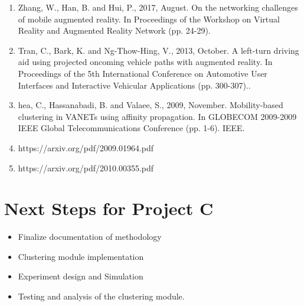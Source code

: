 \documentclass{article}
\begin{document}
\begin{enumerate}
    \item Zhang, W., Han, B. and Hui, P., 2017, August. On the networking challenges of mobile augmented reality. In Proceedings of the Workshop on Virtual Reality and Augmented Reality Network (pp. 24-29).
    \item Tran, C., Bark, K. and Ng-Thow-Hing, V., 2013, October. A left-turn driving aid using projected oncoming vehicle paths with augmented reality. In Proceedings of the 5th International Conference on Automotive User Interfaces and Interactive Vehicular Applications (pp. 300-307)..
    \item hea, C., Hassanabadi, B. and Valaee, S., 2009, November. Mobility-based clustering in VANETs using affinity propagation. In GLOBECOM 2009-2009 IEEE Global Telecommunications Conference (pp. 1-6). IEEE.
    \item https://arxiv.org/pdf/2009.01964.pdf
    \item https://arxiv.org/pdf/2010.00355.pdf
\end{enumerate}

\section{Next Steps for Project C}

\begin{itemize}
    \item Finalize documentation of methodology
    \item Clustering module implementation
    \item Experiment design and Simulation
    \item Testing and analysis of the clustering module.
\end{itemize}
\end{document}
